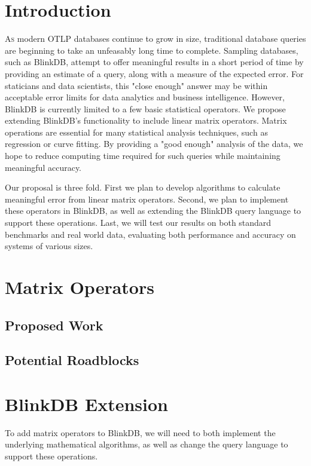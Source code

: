 \documentclass[twoside]{article}
\begin{document}
\begin{multicols}{2} %

\section{Introduction}

\lettrine[nindent=0em,lines=3]{A}s modern OTLP databases continue to grow in size, traditional database queries are beginning to take an unfeasably long time to complete. Sampling databases, such as BlinkDB, attempt to offer meaningful results in a short period of time by providing an estimate of a query, along with a measure of the expected error. For staticians and data scientists, this "close enough"  answer may be within acceptable error limits for data analytics and business intelligence. However, BlinkDB is currently limited to a few basic statistical operators. We propose extending BlinkDB's functionality to include linear matrix operators. Matrix operations are essential for many statistical analysis techniques, such as regression or curve fitting. By providing a "good enough" analysis of the data, we hope to reduce computing time required for such queries while maintaining meaningful accuracy. 

Our proposal is three fold. First we plan to develop algorithms to calculate meaningful error from linear matrix operators. Second, we plan to implement these operators in BlinkDB, as well as extending the BlinkDB query language to support these operations. Last, we will test our results on both standard benchmarks and real world data, evaluating both performance and accuracy on systems of various sizes.


\section{Matrix Operators}
\subsection{Proposed Work}
\subsection{Potential Roadblocks}

\section{BlinkDB Extension}
To add matrix operators to BlinkDB, we will need to both implement the underlying mathematical algorithms, as well as change the query language to support these operations. 

\end{multicols}
\end{document}
